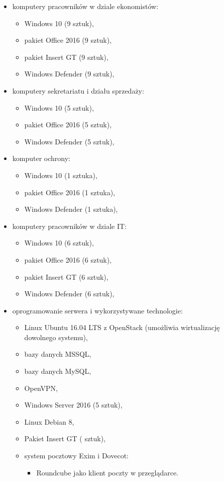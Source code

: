 \begin{minipage}[\right]{15cm}
\begin{itemize}
	\item komputery pracowników w dziale ekonomistów:
	\begin{itemize}
		\item Windows 10 (9 sztuk),
		\item pakiet Office 2016 (9 sztuk),
		\item pakiet Insert GT (9 sztuk),
		\item Windows Defender (9 sztuk),
	\end{itemize}
	\item komputery sekretariatu i działu sprzedaży:
	\begin{itemize}
		\item Windows 10 (5 sztuk),
		\item pakiet Office 2016 (5 sztuk),
		\item Windows Defender (5 sztuk),
	\end{itemize}
	\item komputer ochrony:
	\begin{itemize}
		\item Windows 10 (1 sztuka),
		\item pakiet Office 2016 (1 sztuka),
		\item Windows Defender (1 sztuka),
	\end{itemize}
	\item komputery pracowników w dziale IT:
	\begin{itemize}
		\item Windows 10 (6 sztuk),
		\item pakiet Office 2016 (6 sztuk),
		\item pakiet Insert GT (6 sztuk),
		\item Windows Defender (6 sztuk),
	\end{itemize}
	\item oprogramowanie serwera i wykorzystywane technologie:
	\begin{itemize}
		\item Linux Ubuntu 16.04 LTS z OpenStack (umożliwia wirtualizację
		\linebreak dowolnego systemu),
		\item bazy danych MSSQL,
		\item bazy danych MySQL,
		\item OpenVPN,
		\item Windows Server 2016 (5 sztuk),
		\item Linux Debian 8,
		\item Pakiet Insert GT ( sztuk),
		\item system pocztowy Exim i Dovecot:
		\begin{itemize}
			\item Roundcube jako klient poczty w przeglądarce.
		\end{itemize}
	\end{itemize}
\end{itemize}
\end{minipage}

